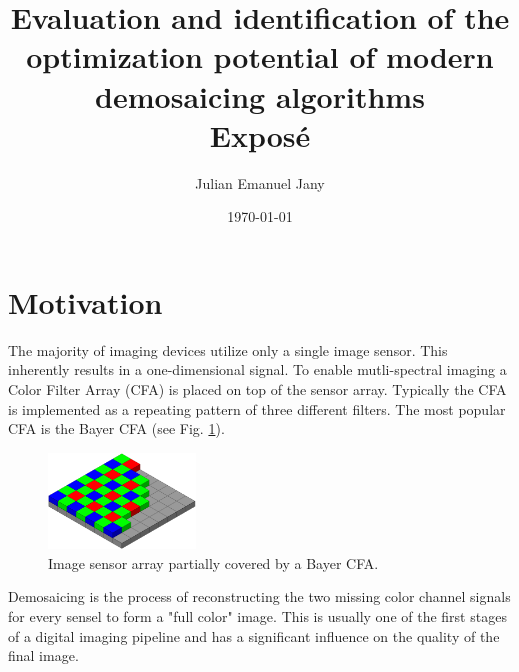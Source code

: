 \documentclass[english,notitlepage,smartquotes]{hgbreport}
\author{Julian Emanuel Jany}                     %
\title{Evaluation and identification of the optimization potential of modern demosaicing algorithms \\ %
			 Exposé}
\date{\today}
\begin{document}
\maketitle



\section{Motivation}

The majority of imaging devices utilize only a single image sensor. This inherently results in a one-dimensional signal. To enable mutli-spectral imaging a Color Filter Array (CFA) is placed on top of the sensor array. Typically the CFA is implemented as a repeating pattern of three different filters. The most popular CFA is the Bayer CFA (see Fig. \ref{fig:bayer_cfa}).

\begin{figure}[]
	\centering
	\includegraphics[width=0.35\textwidth]{bayer_pattern}
\caption{Image sensor array partially covered by a Bayer CFA. \cite{BayerCFA}}
\label{fig:bayer_cfa}
\end{figure}

Demosaicing is the process of reconstructing the two missing color channel signals for every sensel to form a "full color" image. This is usually one of the first stages of a digital imaging pipeline and has a significant influence on the quality of the final image.
\end{document}
